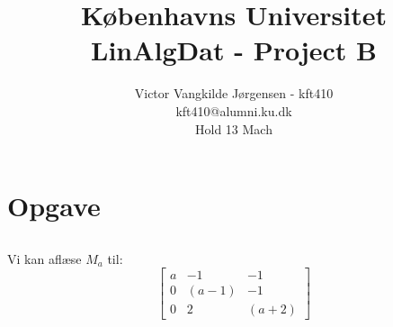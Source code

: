\documentclass[a4paper,12pt]{article}
\title{Københavns Universitet\\
LinAlgDat - Project B}
\author{Victor Vangkilde Jørgensen - kft410\\ 
kft410@alumni.ku.dk\\
Hold 13 Mach}
\begin{document}
 
 
\maketitle 

\section[Opgave]{Opgave}
\subsection{}

Vi kan aflæse $M_a$ til:\\
\[
\left[\begin{array}{ccc}
    a & -1 & -1 \\
    0 & (a-1) & -1 \\
    0 & 2 & (a+2)
\end{array}\right]
\]
\end{document}
